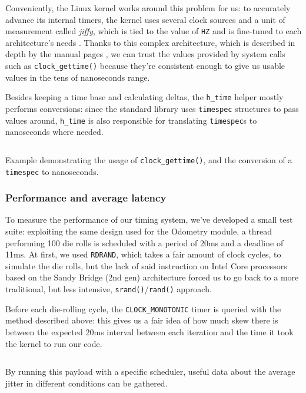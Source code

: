 \documentclass[a4paper,12pt]{report}
\begin{document}
Conveniently, the Linux kernel works around this problem for us: to accurately advance its internal timers, the kernel uses several clock sources and a unit of measurement called \textit{jiffy}, which is tied to the value of \texttt{HZ} and is fine-tuned to each architecture's needs \cite{elinux-hrts}. Thanks to this complex architecture, which is described in depth by the manual pages \cite{man-clock-getres-2}, we can trust the values provided by system calls such as \texttt{clock\_gettime()} because they're consistent enough to give us usable values in the tens of nanoseconds range.

Besides keeping a time base and calculating deltas, the \texttt{h\_time} helper mostly performs conversions: since the standard library uses \texttt{timespec} structures to pass values around, \texttt{h\_time} is also responsible for translating \texttt{timespec}s to nanoseconds where needed.

\begin{listing}[H]
\inputminted[frame=single,framesep=10pt]{c}{snippets/time.c}
\caption{Example demonstrating the usage of \texttt{clock\_gettime()}, and the conversion of a \texttt{timespec} to nanoseconds.}
\end{listing}

\subsubsection{Performance and average latency}

To measure the performance of our timing system, we've developed a small test suite: exploiting the same design used for the Odometry module, a thread performing 100 die rolls is scheduled with a period of 20ms and a deadline of 11ms. At first, we used \texttt{RDRAND}, which takes a fair amount of clock cycles,  to simulate the die rolls, but the lack of said instruction on Intel Core processors based on the Sandy Bridge (2nd gen) architecture forced us to go back to a more traditional, but less intensive, \texttt{srand()}/\texttt{rand()} approach.

Before each die-rolling cycle, the \texttt{CLOCK\_MONOTONIC} timer is queried with the method described above: this gives us a fair idea of how much skew there is between the expected 20ms interval between each iteration and the time it took the kernel to run our code.

\begin{listing}[H]
\inputminted[frame=single,framesep=10pt]{c}{snippets/latency-test.c}
\caption{By running this payload with a specific scheduler, useful data about the average jitter in different conditions can be gathered.}
\end{listing}
\end{document}
